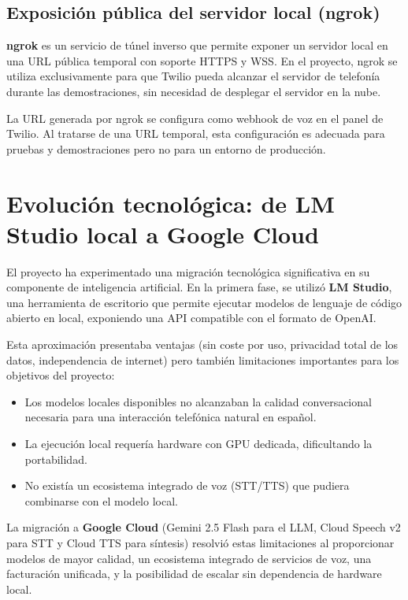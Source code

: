\subsection{Exposición pública del servidor local (ngrok)}
\label{subsec:ngrok_stack}

\textbf{ngrok} es un servicio de túnel inverso que permite exponer un servidor local en una URL pública temporal con soporte HTTPS y WSS. En el proyecto, ngrok se utiliza exclusivamente para que Twilio pueda alcanzar el servidor de telefonía durante las demostraciones, sin necesidad de desplegar el servidor en la nube.

La URL generada por ngrok se configura como webhook de voz en el panel de Twilio. Al tratarse de una URL temporal, esta configuración es adecuada para pruebas y demostraciones pero no para un entorno de producción.

\section{Evolución tecnológica: de LM Studio local a Google Cloud}
\label{sec:evolucion_tecnologica}

El proyecto ha experimentado una migración tecnológica significativa en su componente de inteligencia artificial. En la primera fase, se utilizó \textbf{LM Studio}, una herramienta de escritorio que permite ejecutar modelos de lenguaje de código abierto en local, exponiendo una API compatible con el formato de OpenAI.

Esta aproximación presentaba ventajas (sin coste por uso, privacidad total de los datos, independencia de internet) pero también limitaciones importantes para los objetivos del proyecto:

\begin{itemize}
    \item Los modelos locales disponibles no alcanzaban la calidad conversacional necesaria para una interacción telefónica natural en español.
    \item La ejecución local requería hardware con GPU dedicada, dificultando la portabilidad.
    \item No existía un ecosistema integrado de voz (STT/TTS) que pudiera combinarse con el modelo local.
\end{itemize}

La migración a \textbf{Google Cloud} (Gemini 2.5 Flash para el LLM, Cloud Speech v2 para STT y Cloud TTS para síntesis) resolvió estas limitaciones al proporcionar modelos de mayor calidad, un ecosistema integrado de servicios de voz, una facturación unificada, y la posibilidad de escalar sin dependencia de hardware local.

